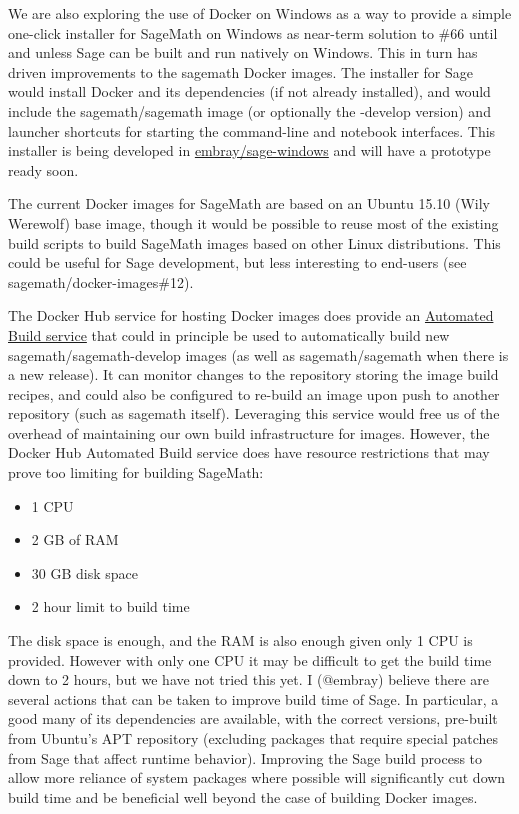 We are also exploring the use of Docker on Windows as a way to provide a
simple one-click installer for SageMath on Windows as near-term solution
to \#66 until and unless Sage can be built and run natively on Windows.
This in turn has driven improvements to the sagemath Docker images. The
installer for Sage would install Docker and its dependencies (if not
already installed), and would include the sagemath/sagemath image (or
optionally the -develop version) and launcher shortcuts for starting the
command-line and notebook interfaces. This installer is being developed
in \href{https://github.com/embray/sage-windows}{embray/sage-windows}
and will have a prototype ready soon.

The current Docker images for SageMath are based on an Ubuntu 15.10
(Wily Werewolf) base image, though it would be possible to reuse most of
the existing build scripts to build SageMath images based on other Linux
distributions. This could be useful for Sage development, but less
interesting to end-users (see sagemath/docker-images\#12).

The Docker Hub service for hosting Docker images does provide an
\href{https://docs.docker.com/docker-hub/builds/}{Automated Build
service} that could in principle be used to automatically build new
sagemath/sagemath-develop images (as well as sagemath/sagemath when
there is a new release). It can monitor changes to the repository
storing the image build recipes, and could also be configured to
re-build an image upon push to another repository (such as sagemath
itself). Leveraging this service would free us of the overhead of
maintaining our own build infrastructure for images. However, the Docker
Hub Automated Build service does have resource restrictions that may
prove too limiting for building SageMath:

\begin{itemize}
\tightlist
\item
  1 CPU
\item
  2 GB of RAM
\item
  30 GB disk space
\item
  2 hour limit to build time
\end{itemize}

The disk space is enough, and the RAM is also enough given only 1 CPU is
provided. However with only one CPU it may be difficult to get the build
time down to 2 hours, but we have not tried this yet. I (@embray)
believe there are several actions that can be taken to improve build
time of Sage. In particular, a good many of its dependencies are
available, with the correct versions, pre-built from Ubuntu's APT
repository (excluding packages that require special patches from Sage
that affect runtime behavior). Improving the Sage build process to allow
more reliance of system packages where possible will significantly cut
down build time and be beneficial well beyond the case of building
Docker images.

